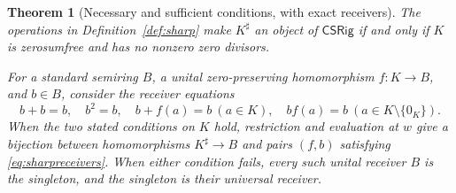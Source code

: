 \documentclass[11pt]{article}
\newtheorem{theorem}{Theorem}[section]
\theoremstyle{definition}
\newcommand{\SSS}{\mathsf{CSRig}}
\begin{document}
\begin{theorem}[Necessary and sufficient conditions, with exact receivers]
\label{thm:sharpcriterion}
The operations in Definition~\ref{def:sharp} make \(K^\sharp\) an object
of \(\SSS\) if and only if \(K\) is zerosumfree and has no nonzero
zero divisors.

For a standard semiring \(B\), a unital zero-preserving homomorphism
\(f:K\to B\), and \(b\in B\), consider the receiver equations
\[
 b+b=b,\quad b^2=b,\quad b+f(a)=b\ (a\in K),\quad
 bf(a)=b\ (a\in K\setminus\{0_K\}).
\tag{17}\label{eq:sharpreceivers}
\]
When the two stated conditions on \(K\) hold, restriction and evaluation
at \(w\) give a bijection between homomorphisms \(K^\sharp\to B\)
and pairs \((f,b)\) satisfying \eqref{eq:sharpreceivers}.
When either condition fails, every such unital receiver \(B\) is the
singleton, and the singleton is their universal receiver.
\end{theorem}
\end{document}
